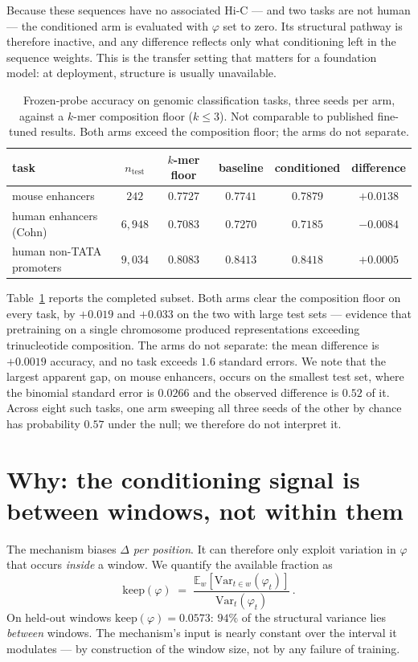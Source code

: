 \documentclass[10pt]{article}
\begin{document}
Because these sequences have no associated Hi-C --- and two tasks are not human
--- the conditioned arm is evaluated with $\varphi$ set to zero. Its structural
pathway is therefore inactive, and any difference reflects only what
conditioning left in the sequence weights. This is the transfer setting that
matters for a foundation model: at deployment, structure is usually unavailable.

\begin{table}[t]
\centering\small
\caption{Frozen-probe accuracy on genomic classification tasks, three seeds per
arm, against a $k$-mer composition floor ($k \le 3$). Not comparable to published
fine-tuned results. Both arms exceed the composition floor; the arms do not
separate.}
\label{tab:bench}
\begin{tabular}{lccccc}
\toprule
task & $n_{\text{test}}$ & $k$-mer floor & baseline & conditioned & difference \\
\midrule
mouse enhancers & $242$ & $0.7727$ & $0.7741$ & $0.7879$ & $+0.0138$ \\
human enhancers (Cohn) & $6{,}948$ & $0.7083$ & $0.7270$ & $0.7185$ & $-0.0084$ \\
human non-TATA promoters & $9{,}034$ & $0.8083$ & $0.8413$ & $0.8418$ & $+0.0005$ \\
\bottomrule
\end{tabular}
\end{table}

Table~\ref{tab:bench} reports the completed subset. Both arms clear the
composition floor on every task, by $+0.019$ and $+0.033$ on the two with large
test sets --- evidence that pretraining on a single chromosome produced
representations exceeding trinucleotide composition. The arms do not separate:
the mean difference is $+0.0019$ accuracy, and no task exceeds $1.6$ standard
errors. We note that the largest apparent gap, on mouse enhancers, occurs on the
smallest test set, where the binomial standard error is $0.0266$ and the
observed difference is $0.52$ of it. Across eight such tasks, one arm sweeping
all three seeds of the other by chance has probability $0.57$ under the null;
we therefore do not interpret it.

\section{Why: the conditioning signal is between windows, not within them}
\label{sec:why}

The mechanism biases $\Delta$ \emph{per position}. It can therefore only exploit
variation in $\varphi$ that occurs \emph{inside} a window. We quantify the
available fraction as
\begin{equation}
\mathrm{keep}(\varphi) \;=\;
\frac{\mathbb{E}_w\left[\mathrm{Var}_{t \in w}(\varphi_t)\right]}
     {\mathrm{Var}_{t}(\varphi_t)}\,.
\end{equation}
On held-out windows $\mathrm{keep}(\varphi) = 0.0573$: $94\%$ of the structural
variance lies \emph{between} windows. The mechanism's input is nearly constant
over the interval it modulates --- by construction of the window size, not by
any failure of training.
\end{document}
